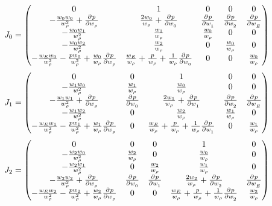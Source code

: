 \documentclass[12pt]{article}
\numberwithin{equation}{section}
\numberwithin{figure}{section}
\begin{document}
\begin{equation}
J_0 = \begin{pmatrix} 
0 & 1 & 0 & 0 & 0 \\
-\frac{w_0 w_0}{w_\rho ^ 2} + \frac{\partial^{} p}{\partial w_\rho^{}} & \frac{2w_0}{w_\rho} + \frac{\partial^{} p}{\partial w_0^{}} & \frac{\partial^{} p}{\partial w_1^{}} & \frac{\partial^{} p}{\partial w_2^{}} & \frac{\partial^{} p}{\partial w_E^{}}\\
-\frac{w_0 w_1}{w_\rho ^ 2} & \frac{w_1}{w_\rho} & \frac{w_0}{w_\rho} & 0 & 0\\
-\frac{w_0 w_2}{w_\rho ^ 2} & \frac{w_2}{w_\rho} & 0 & \frac{w_0}{w_\rho} & 0\\
-\frac{w_Ew_0}{w_\rho^2} - \frac{pw_0}{w_\rho^2} + \frac{w_0}{w_\rho}\frac{\partial^{} p}{\partial w_\rho^{}} & \frac{w_E}{w_\rho} + \frac{p}{w_\rho} + \frac{1}{w_\rho}\frac{\partial^{} p}{\partial w_0^{}} & 0 & 0 & \frac{w_0}{w_\rho}
 \end{pmatrix}
\end{equation}
\begin{equation}
J_1 = \begin{pmatrix} 
0 & 0 & 1 & 0 & 0 \\
-\frac{w_1 w_0}{w_\rho ^ 2}& \frac{w_1}{w_\rho} & \frac{w_0}{w_\rho} & 0 & 0\\
-\frac{w_1 w_1}{w_\rho ^ 2} + \frac{\partial^{} p}{\partial w_\rho^{}} & \frac{\partial^{} p}{\partial w_0^{}} & \frac{2w_1}{w_\rho} + \frac{\partial^{} p}{\partial w_1^{}} & \frac{\partial^{} p}{\partial w_2^{}} & \frac{\partial^{} p}{\partial w_E^{}}\\
-\frac{w_1 w_2}{w_\rho ^ 2} & 0 & \frac{w_2}{w_\rho} & \frac{w_1}{w_\rho} & 0\\
-\frac{w_Ew_1}{w_\rho^2} - \frac{pw_1}{w_\rho^2} + \frac{w_1}{w_\rho}\frac{\partial^{} p}{\partial w_\rho^{}} & 0 & \frac{w_E}{w_\rho} + \frac{p}{w_\rho} + \frac{1}{w_\rho}\frac{\partial^{} p}{\partial w_1^{}} & 0 & \frac{w_1}{w_\rho}
 \end{pmatrix}
\end{equation}
\begin{equation}
J_2 = \begin{pmatrix} 
0 & 0 & 0 & 1 & 0 \\
-\frac{w_2 w_0}{w_\rho ^ 2}& \frac{w_2}{w_\rho} & 0 & \frac{w_0}{w_\rho} & 0\\
-\frac{w_2 w_1}{w_\rho ^ 2} & 0 & \frac{w_2}{w_\rho} & \frac{w_1}{w_\rho} & 0\\
-\frac{w_2 w_2}{w_\rho ^ 2} + \frac{\partial^{} p}{\partial w_\rho^{}} & \frac{\partial^{} p}{\partial w_0^{}} & \frac{\partial^{} p}{\partial w_1^{}} & \frac{2w_2}{w_\rho} + \frac{\partial^{} p}{\partial w_2^{}} & \frac{\partial^{} p}{\partial w_E^{}}\\
-\frac{w_Ew_2}{w_\rho^2} - \frac{pw_2}{w_\rho^2} + \frac{w_2}{w_\rho}\frac{\partial^{} p}{\partial w_\rho^{}} & 0 & 0 & \frac{w_E}{w_\rho} + \frac{p}{w_\rho} + \frac{1}{w_\rho}\frac{\partial^{} p}{\partial w_2^{}} & \frac{w_2}{w_\rho}
 \end{pmatrix}
\end{equation}
\end{document}
